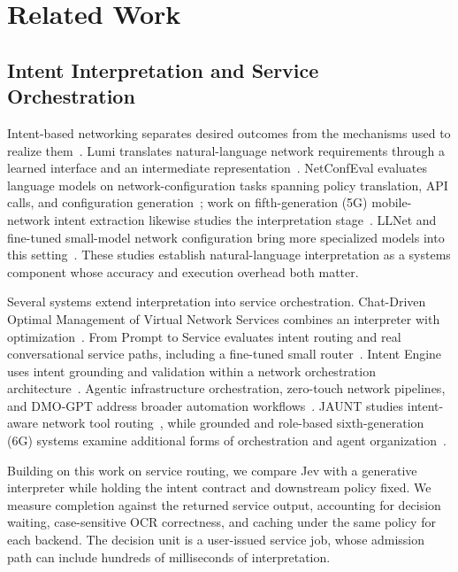 \section{Related Work}
\subsection{Intent Interpretation and Service Orchestration}
Intent-based networking separates desired outcomes from the mechanisms used to
realize them~\cite{clemm2022intentbased}. Lumi translates natural-language
network requirements through a learned interface and an intermediate
representation~\cite{jacobs2021hey}. NetConfEval evaluates language models on
network-configuration tasks spanning policy translation, API calls, and
configuration generation~\cite{wang2024netconfeval}; work on fifth-generation (5G) mobile-network intent
extraction likewise studies the interpretation stage~\cite{manias2024intentbased}.
LLNet and fine-tuned small-model network configuration bring more specialized
models into this setting~\cite{angi2025llnet,lira2025network}. These studies
establish natural-language interpretation as a systems component whose
accuracy and execution overhead both matter.

Several systems extend interpretation into service orchestration.
Chat-Driven Optimal Management of Virtual Network Services combines an
interpreter with optimization~\cite{miyaoka2025chatdriven}. From Prompt to
Service evaluates intent routing and real conversational service paths,
including a fine-tuned small router~\cite{nisiotis2026prompt}. Intent Engine
uses intent grounding and validation within a network
orchestration architecture~\cite{islam2026intent}. Agentic infrastructure
orchestration, zero-touch network pipelines, and DMO-GPT address broader
automation workflows~\cite{brodimas2025intentbased,seo2026integrated,mekrache2026dmogpt}.
JAUNT studies intent-aware network tool routing~\cite{li2025jaunt}, while
grounded and role-based sixth-generation (6G) systems examine additional forms of orchestration
and agent organization~\cite{martins2026intentdriven,parra-ullauri2026rolebased}.

Building on this work on service routing, we compare Jev with a generative
interpreter while holding the intent contract and downstream policy fixed.
We measure completion against the returned service output, accounting for
decision waiting, case-sensitive OCR correctness, and caching under the same
policy for each backend. The decision unit is a user-issued service job,
whose admission path can include hundreds of milliseconds of interpretation.

